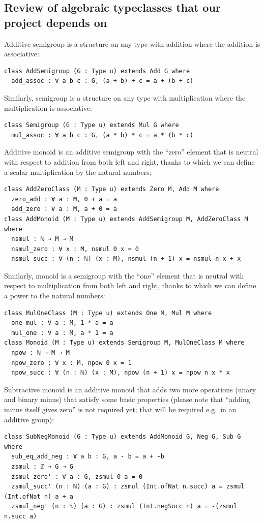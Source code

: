 \documentclass[]{article}
\renewcommand{\.}{\hskip .75pt}
\begin{document}
\subsection{Review of algebraic typeclasses that our project depends on}
\label{preliminaries-typeclasses}

Additive semigroup is a structure on any type with addition where the addition is associative:
\begin{lstlisting}
class AddSemigroup (G : Type u) extends Add G where
  add_assoc : ∀ a b c : G, (a + b) + c = a + (b + c)
\end{lstlisting}
Similarly, semigroup is a structure on any type with multiplication where the multiplication is associative:
\begin{lstlisting}
class Semigroup (G : Type u) extends Mul G where
  mul_assoc : ∀ a b c : G, (a * b) * c = a * (b * c)
\end{lstlisting}
Additive monoid is an additive semigroup with the ``zero'' element that is neutral with respect to addition
from both left and right, thanks to which we can define a scalar multiplication by the natural numbers:
\begin{lstlisting}
class AddZeroClass (M : Type u) extends Zero M, Add M where
  zero_add : ∀ a : M, 0 + a = a
  add_zero : ∀ a : M, a + 0 = a
class AddMonoid (M : Type u) extends AddSemigroup M, AddZeroClass M where
  nsmul : ℕ → M → M
  nsmul_zero : ∀ x : M, nsmul 0 x = 0 
  nsmul_succ : ∀ (n : ℕ) (x : M), nsmul (n + 1) x = nsmul n x + x 
\end{lstlisting}
Similarly, monoid is a semigroup with the ``one'' element that is neutral with respect to multiplication
from both left and right, thanks to which we can define a power to the natural numbers:
\begin{lstlisting}
class MulOneClass (M : Type u) extends One M, Mul M where
  one_mul : ∀ a : M, 1 * a = a
  mul_one : ∀ a : M, a * 1 = a
class Monoid (M : Type u) extends Semigroup M, MulOneClass M where
  npow : ℕ → M → M 
  npow_zero : ∀ x : M, npow 0 x = 1 
  npow_succ : ∀ (n : ℕ) (x : M), npow (n + 1) x = npow n x * x 
\end{lstlisting}
Subtractive monoid is an additive monoid that adds two more operations (unary and binary minus)
that satisfy some basic properties (please note that ``adding minus itself gives zero''
is not required yet; that will be required e.g.~in an additive group):
\begin{lstlisting}
class SubNegMonoid (G : Type u) extends AddMonoid G, Neg G, Sub G where
  sub_eq_add_neg : ∀ a b : G, a - b = a + -b 
  zsmul : ℤ → G → G
  zsmul_zero' : ∀ a : G, zsmul 0 a = 0 
  zsmul_succ' (n : ℕ) (a : G) : zsmul (Int.ofNat n.succ) a = zsmul (Int.ofNat n) a + a
  zsmul_neg' (n : ℕ) (a : G) : zsmul (Int.negSucc n) a = -(zsmul n.succ a)
\end{lstlisting}
\end{document}
